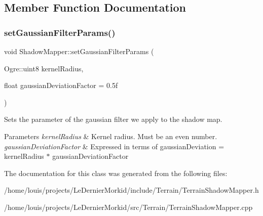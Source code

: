 \subsection{Member Function Documentation}
\mbox{\label{class_shadow_mapper_a5438f906adc558347171a1d4fbbe616d}} 
\subsubsection{\texorpdfstring{set\+Gaussian\+Filter\+Params()}{setGaussianFilterParams()}}
{\footnotesize\ttfamily void Shadow\+Mapper\+::set\+Gaussian\+Filter\+Params (\begin{DoxyParamCaption}\item[{Ogre\+::uint8}]{kernel\+Radius,  }\item[{float}]{gaussian\+Deviation\+Factor = {\ttfamily 0.5f} }\end{DoxyParamCaption})}

Sets the parameter of the gaussian filter we apply to the shadow map. 
\begin{DoxyParams}{Parameters}
{\em kernel\+Radius} & Kernel radius. Must be an even number. \\
\hline
{\em gaussian\+Deviation\+Factor} & Expressed in terms of gaussian\+Deviation = kernel\+Radius $\ast$ gaussian\+Deviation\+Factor \\
\hline
\end{DoxyParams}


The documentation for this class was generated from the following files\+:\begin{DoxyCompactItemize}
\item 
/home/louis/projects/\+Le\+Dernier\+Morkid/include/\+Terrain/Terrain\+Shadow\+Mapper.\+h\item 
/home/louis/projects/\+Le\+Dernier\+Morkid/src/\+Terrain/Terrain\+Shadow\+Mapper.\+cpp\end{DoxyCompactItemize}
